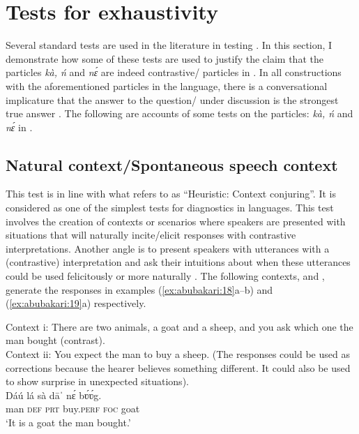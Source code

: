 \documentclass[output=paper,modfonts,nonflat,
 hidelinks
]{langsci/langscibook}
\begin{document}
\section{Tests for exhaustivity}

 
Several standard tests are used in the literature in testing . In this section, I demonstrate how some of these tests are used to justify the claim that the particles \textit{kà, ń} and \textit{nɛ́} are indeed contrastive{\slash} particles in . In all  constructions with the aforementioned particles in the language, there is a conversational implicature that the answer to the question/ under discussion is the strongest true answer \citep{Beaver2008,roberts2012}. The following are accounts of some tests on the particles: \textit{kà, ń} and \textit{nɛ́} in .
 

\subsection{Natural context/Spontaneous speech context}

This test is in line with what \citet{vanderWal2013} refers to as   ``Heuristic: Context conjuring''. It is considered as one of the simplest tests for  diagnostics in languages. This test involves the creation of contexts or scenarios where speakers are presented with situations that will naturally incite/elicit responses with contrastive  interpretations. Another angle is to present speakers with utterances with a (contrastive)  interpretation and ask their intuitions about when these utterances could be used felicitously or more naturally \citep[5]{vanderWal2013}. The following contexts,  and , generate the responses in examples (\ref{ex:abubakari:18}a--b) and (\ref{ex:abubakari:19}a) respectively.

 
\ea\label{ex:abubakari:18} 
Context i: There are two animals, a goat and a sheep, and you ask which one the       man bought (contrast).\\
 
 
Context ii: You expect the man to buy a sheep. (The responses could be used as   corrections because the hearer believes something different. It could also be used to show surprise in unexpected situations).\\
 
\ea\label{ex:abubakari:18a}
\gll Dáú  lá  sà  dāˈ    nɛ́  bʋ́ʋ́g.\\
man  \textsc{def}  \textsc{prt}  buy.\textsc{perf}  \textsc{foc}  goat\\
\glt ‘It is a goat the man bought.’
\end{document}
